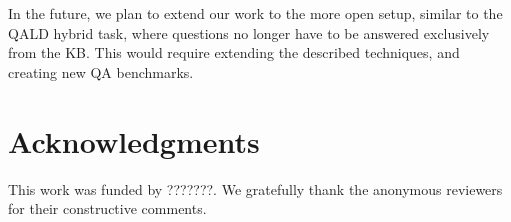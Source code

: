 \documentclass{sig-alternate-05-2015}
\begin{document}
In the future, we plan to extend our work to the more open setup, similar to the QALD hybrid task, where questions no longer have to be answered exclusively from the KB.
This would require extending the described techniques, and creating new QA benchmarks.

\section{Acknowledgments}
This work was funded by ???????.
We gratefully thank the anonymous reviewers for their constructive comments.

%

\vspace{1.0cm}

%
%
\end{document}
